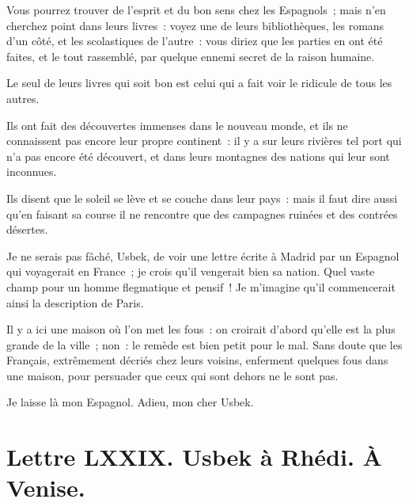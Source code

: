 \documentclass[french,twoside]{book} %
\newcommand{\dateline}[1]{\medskip{\RaggedLeft{#1}\par}\bigskip}
\begin{document}
Vous pourrez trouver de l’esprit et du bon sens chez les Espagnols ; mais n’en cherchez point dans leurs livres : voyez une de leurs bibliothèques, les romans d’un côté, et les scolastiques de l’autre : vous diriez que les parties en ont été faites, et le tout rassemblé, par quelque ennemi secret de la raison humaine.\par
Le seul de leurs livres qui soit bon est celui qui a fait voir le ridicule de tous les autres.\par
Ils ont fait des découvertes immenses dans le nouveau monde, et ils ne connaissent pas encore leur propre continent : il y a sur leurs rivières tel port qui n’a pas encore été découvert, et dans leurs montagnes des nations qui leur sont inconnues.\par
Ils disent que le soleil se lève et se couche dans leur pays : mais il faut dire aussi qu’en faisant sa course il ne rencontre que des campagnes ruinées et des contrées désertes.\par
Je ne serais pas fâché, Usbek, de voir une lettre écrite à Madrid par un Espagnol qui voyagerait en France ; je crois qu’il vengerait bien sa nation. Quel vaste champ pour un homme flegmatique et pensif ! Je m’imagine qu’il commencerait ainsi la description de Paris.\par
Il y a ici une maison où l’on met les fous : on croirait d’abord qu’elle est la plus grande de la ville ; non : le remède est bien petit pour le mal. Sans doute que les Français, extrêmement décriés chez leurs voisins, enferment quelques fous dans une maison, pour persuader que ceux qui sont dehors ne le sont pas.\par
Je laisse là mon Espagnol. Adieu, mon cher Usbek.\par

\dateline{De Paris, le 17 de la lune de Saphar, 1715.}
\section[{Lettre LXXIX. Usbek à Rhédi. À Venise.}]{Lettre LXXIX. Usbek à Rhédi. À Venise.}\renewcommand{\leftmark}{Lettre LXXIX. Usbek à Rhédi. À Venise.}
\end{document}

